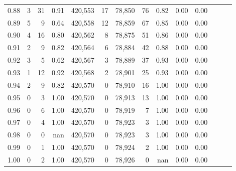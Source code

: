 \begin{tabular}{rrrrrrrrrrrrrr}
0.88 &       3 &     31 &  0.91 &  420,553 &       17 &  78,850 &      76 &  0.82 &  0.00 &      0.00 \\
0.89 &       5 &      9 &  0.64 &  420,558 &       12 &  78,859 &      67 &  0.85 &  0.00 &      0.00 \\
0.90 &       4 &     16 &  0.80 &  420,562 &        8 &  78,875 &      51 &  0.86 &  0.00 &      0.00 \\
0.91 &       2 &      9 &  0.82 &  420,564 &        6 &  78,884 &      42 &  0.88 &  0.00 &      0.00 \\
0.92 &       3 &      5 &  0.62 &  420,567 &        3 &  78,889 &      37 &  0.93 &  0.00 &      0.00 \\
0.93 &       1 &     12 &  0.92 &  420,568 &        2 &  78,901 &      25 &  0.93 &  0.00 &      0.00 \\
0.94 &       2 &      9 &  0.82 &  420,570 &        0 &  78,910 &      16 &  1.00 &  0.00 &      0.00 \\
0.95 &       0 &      3 &  1.00 &  420,570 &        0 &  78,913 &      13 &  1.00 &  0.00 &      0.00 \\
0.96 &       0 &      6 &  1.00 &  420,570 &        0 &  78,919 &       7 &  1.00 &  0.00 &      0.00 \\
0.97 &       0 &      4 &  1.00 &  420,570 &        0 &  78,923 &       3 &  1.00 &  0.00 &      0.00 \\
0.98 &       0 &      0 &   nan &  420,570 &        0 &  78,923 &       3 &  1.00 &  0.00 &      0.00 \\
0.99 &       0 &      1 &  1.00 &  420,570 &        0 &  78,924 &       2 &  1.00 &  0.00 &      0.00 \\
1.00 &       0 &      2 &  1.00 &  420,570 &        0 &  78,926 &       0 &   nan &  0.00 &      0.00 \\
\bottomrule
\end{tabular}

